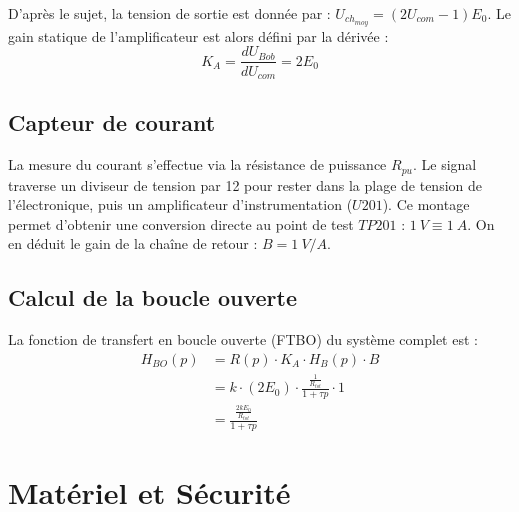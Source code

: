 \documentclass[11pt]{report}
\begin{document}
D'après le sujet, la tension de sortie est donnée par : $U_{ch_{moy}} = (2 U_{com} - 1)E_0$.
Le gain statique de l'amplificateur est alors défini par la dérivée :
\begin{equation*}
  K_A = \frac{dU_{Bob}}{dU_{com}} = 2E_0
\end{equation*}

\subsection{Capteur de courant}
La mesure du courant s'effectue via la résistance de puissance $R_{pu}$. Le signal traverse un diviseur de tension par 12 pour rester dans la plage de tension de l'électronique, puis un amplificateur d'instrumentation ($U201$). 
Ce montage permet d'obtenir une conversion directe au point de test $TP201$ : $\qty{1}{V} \equiv \qty{1}{A}$.
On en déduit le gain de la chaîne de retour : $B = \qty{1}{V/A}$.

\subsection{Calcul de la boucle ouverte}
La fonction de transfert en boucle ouverte (FTBO) du système complet est :
\begin{align*}
  H_{BO}(p) &= R(p) \cdot K_A \cdot H_B(p) \cdot B \\ 
            &= k \cdot (2E_0) \cdot \frac{\frac{1}{R_{tot}}}{1+\tau p} \cdot 1 \\
            &= \boxed{\frac{\frac{2kE_0}{R_{tot}}}{1+\tau p}}
\end{align*}

\section{Matériel et Sécurité}
\end{document}

